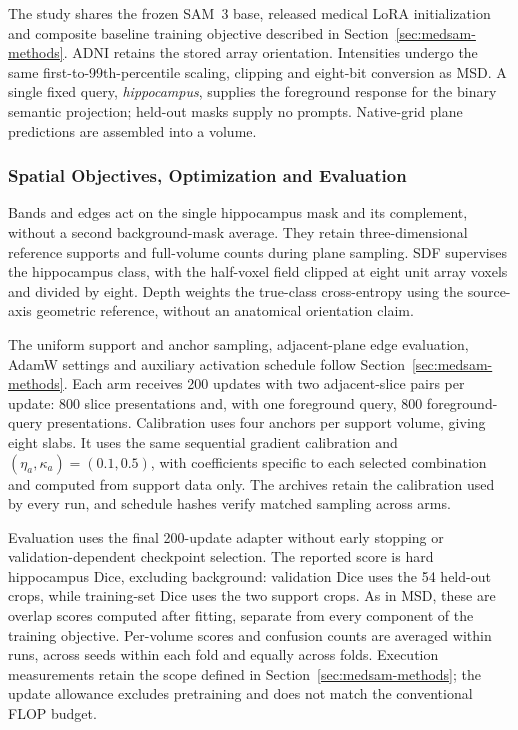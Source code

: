 \documentclass[12pt,a4paper]{article}
\begin{document}
The study shares the frozen SAM~3 base, released medical LoRA
initialization and composite baseline training objective
described in Section~\ref{sec:medsam-methods}.
ADNI retains the stored array orientation. Intensities undergo the
same first-to-99th-percentile scaling, clipping and eight-bit conversion
as MSD. A single fixed query, \emph{hippocampus}, supplies the foreground
response for the binary semantic projection; held-out masks supply no
prompts. Native-grid plane predictions are assembled into a volume.

\subsubsection{Spatial Objectives, Optimization and Evaluation}

Bands and edges act on the single hippocampus mask and its complement,
without a second background-mask average. They retain three-dimensional
reference supports and full-volume counts during plane sampling.
SDF supervises the hippocampus class, with the half-voxel field clipped
at eight unit array voxels and divided by eight. Depth weights the
true-class cross-entropy using the source-axis geometric reference,
without an anatomical orientation claim.

The uniform support and anchor sampling, adjacent-plane edge evaluation,
AdamW settings and auxiliary activation schedule follow
Section~\ref{sec:medsam-methods}. Each arm receives 200 updates with two
adjacent-slice pairs per update: 800 slice presentations and, with one
foreground query, 800 foreground-query presentations. Calibration uses
four anchors per support volume, giving eight slabs. It uses the same
sequential gradient calibration and $(\eta_a,\kappa_a)=(0.1,0.5)$,
with coefficients specific to each selected combination and computed
from support data only. The archives retain the calibration used by
every run, and schedule hashes verify matched sampling across arms.

Evaluation uses the final 200-update adapter without early stopping or
validation-dependent checkpoint selection. The reported score is hard
hippocampus Dice, excluding background: validation Dice uses the 54
held-out crops, while training-set Dice uses the two support crops.
As in MSD, these are overlap scores computed after fitting, separate
from every component of the training objective. Per-volume scores and
confusion counts are averaged within runs, across seeds within each
fold and equally across folds. Execution measurements retain the scope
defined in Section~\ref{sec:medsam-methods}; the update allowance excludes
pretraining and does not match the conventional FLOP budget.
\end{document}

